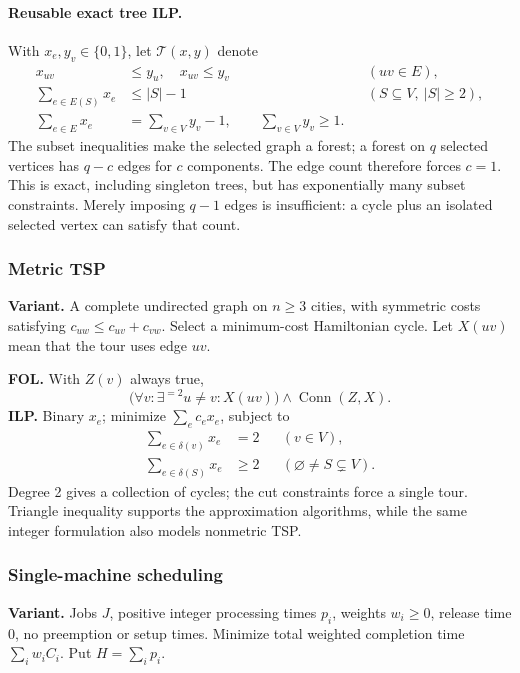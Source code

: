 \paragraph{Reusable exact tree ILP.}\label{form:tree-template}
With $x_e,y_v\in\{0,1\}$, let $\mathcal T(x,y)$ denote
\[
\begin{aligned}
 x_{uv}&\le y_u,\quad x_{uv}\le y_v &&(uv\in E),\\
 \sum_{e\in E(S)}x_e&\le |S|-1 &&(S\subseteq V,\ |S|\ge2),\\
 \sum_{e\in E}x_e&=\sum_{v\in V}y_v-1,\qquad
 \sum_{v\in V}y_v\ge1.
\end{aligned}
\]
The subset inequalities make the selected graph a forest; a forest on
$q$ selected vertices has $q-c$ edges for $c$ components. The edge count
therefore forces $c=1$. This is exact, including singleton trees, but has
exponentially many subset constraints. Merely imposing $q-1$ edges is
insufficient: a cycle plus an isolated selected vertex can satisfy that count.

\subsubsection{Metric TSP}\label{form:tsp}
\textbf{Variant.} A complete undirected graph on $n\ge3$ cities, with
symmetric costs satisfying $c_{uw}\le c_{uv}+c_{vw}$. Select a minimum-cost
Hamiltonian cycle. Let $X(uv)$ mean that the tour uses edge $uv$.

\textbf{FOL.} With $Z(v)$ always true,
\[
 \bigl(\forall v:\exists^{=2}u\ne v:X(uv)\bigr)
 \land\operatorname{Conn}(Z,X).
\]
\textbf{ILP.} Binary $x_e$; minimize $\sum_e c_ex_e$, subject to
\[
\begin{aligned}
 \sum_{e\in\delta(v)}x_e&=2 &&(v\in V),\\
 \sum_{e\in\delta(S)}x_e&\ge2 &&(\varnothing\ne S\subsetneq V).
\end{aligned}
\]
Degree 2 gives a collection of cycles; the cut constraints force a single
tour. Triangle inequality supports the approximation algorithms, while
the same integer formulation also models nonmetric TSP.

\subsubsection{Single-machine scheduling}\label{form:single}
\textbf{Variant.} Jobs $J$, positive integer processing times $p_i$, weights
$w_i\ge0$, release time 0, no preemption or setup times. Minimize total
weighted completion time $\sum_iw_iC_i$. Put $H=\sum_i p_i$.

